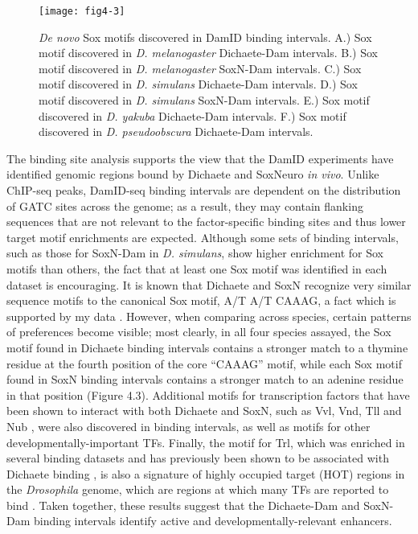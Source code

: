 \begin{figure}[ht]
	\centering
	\texttt{[image: fig4-3]}
	\caption{\emph{De novo} Sox motifs discovered in DamID binding intervals. A.) Sox motif discovered in \emph{D. melanogaster} Dichaete-Dam intervals. B.) Sox motif discovered in \emph{D. melanogaster} SoxN-Dam intervals. C.) Sox motif discovered in \emph{D. simulans} Dichaete-Dam intervals. D.) Sox motif discovered in \emph{D. simulans} SoxN-Dam intervals. E.) Sox motif discovered in \emph{D. yakuba} Dichaete-Dam intervals. F.) Sox motif discovered in \emph{D. pseudoobscura} Dichaete-Dam intervals.}
	\label{Figure 4.3}
\end{figure}

The binding site analysis supports the view that the DamID experiments have identified genomic regions bound by Dichaete and SoxNeuro \emph{in vivo}. Unlike ChIP-seq peaks, DamID-seq binding intervals are dependent on the distribution of GATC sites across the genome; as a result, they may contain flanking sequences that are not relevant to the factor-specific binding sites and thus lower target motif enrichments are expected. Although some sets of binding intervals, such as those for SoxN-Dam in \emph{D. simulans}, show higher enrichment for Sox motifs than others, the fact that at least one Sox motif was identified in each dataset is encouraging. It is known that Dichaete and SoxN recognize very similar sequence motifs to the canonical Sox motif, A/T A/T CAAAG, a fact which is supported by my data \citep{aleksic_role_2013,ferrero_soxneuro_2014}. However, when comparing across species, certain patterns of preferences become visible; most clearly, in all four species assayed, the Sox motif found in Dichaete binding intervals contains a stronger match to a thymine residue at the fourth position of the core “CAAAG” motif, while each Sox motif found in SoxN binding intervals contains a stronger match to an adenine residue in that position (Figure 4.3). Additional motifs for transcription factors that have been shown to interact with both Dichaete and SoxN, such as Vvl, Vnd, Tll and Nub \citep{aleksic_role_2013,ferrero_soxneuro_2014,soriano_drosophila_1998}, were also discovered in binding intervals, as well as motifs for other developmentally-important TFs. Finally, the motif for Trl, which was enriched in several binding datasets and has previously been shown to be associated with Dichaete binding \citep{aleksic_role_2013}, is also a signature of highly occupied target (HOT) regions in the \emph{Drosophila} genome, which are regions at which many TFs are reported to bind \citep{kvon_hot_2012}. Taken together, these results suggest that the Dichaete-Dam and SoxN-Dam binding intervals identify active and developmentally-relevant enhancers.

